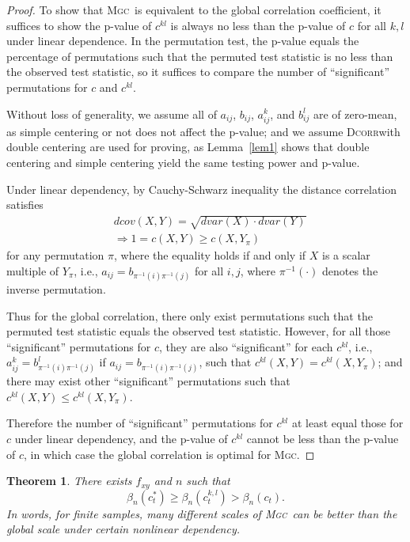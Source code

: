 \documentclass[11pt]{article}
\providecommand{\sct}[1]{{\normalfont\textsc{#1}}}
\newcommand{\G}{c}
\newcommand{\Mgc}{\sct{Mgc}}
\newcommand{\Dcorr}{\sct{Dcorr}}
\newtheorem{appThm}{Theorem}
\begin{document}
\begin{proof}
To show that \Mgc~is equivalent to the global correlation coefficient, it suffices to show the p-value of $\G^{kl}$ is always no less than the p-value of $\G$ for all $k,l$ under linear dependence. In the permutation test, the p-value equals the percentage of permutations such that the permuted test statistic is no less than the observed test statistic, so it suffices to compare the number of ``significant'' permutations for $\G$ and $\G^{kl}$.

Without loss of generality, we assume all of $a_{ij}$, $b_{ij}$, $a_{ij}^{k}$, and $b_{ij}^{l}$ are of zero-mean, as simple centering or not does not affect the p-value; and we assume \Dcorr with double centering are used for proving, as Lemma~\ref{lem1} shows that double centering and simple centering yield the same testing power and p-value.

Under linear dependency, by Cauchy-Schwarz inequality the distance correlation satisfies
\begin{align*}
& dcov(X,Y) = \sqrt{dvar(X) \cdot dvar(Y)} \\
& \Rightarrow 1=\G(X, Y) \geq \G(X, Y_{\pi})
\end{align*}
for any permutation $\pi$, where the equality holds if and only if $X$ is a scalar multiple of $Y_{\pi}$, i.e., $a_{ij}=b_{\pi^{-1}(i) \pi^{-1}(j)}$ for all $i,j$, where $\pi^{-1}(\cdot)$ denotes the inverse permutation. %

Thus for the global correlation, there only exist permutations such that the permuted test statistic equals the observed test statistic. However, for all those ``significant'' permutations for $\G$, they are also ``significant'' for each $\G^{kl}$, i.e., $a_{ij}^{k}=b_{\pi^{-1}(i) \pi^{-1}(j)}^{l}$ if $a_{ij}=b_{\pi^{-1}(i) \pi^{-1}(j)}$, such that $\G^{kl}(X, Y)=\G^{kl}(X, Y_{\pi})$; and there may exist other ``significant'' permutations such that $\G^{kl}(X, Y) \leq \G^{kl}(X, Y_{\pi})$.

Therefore the number of ``significant'' permutations for $\G^{kl}$ at least equal those for $\G$ under linear dependency, and the p-value of $\G^{kl}$ cannot be less than the p-value of $\G$, in which case the global correlation is optimal for \Mgc. 
\end{proof}


\begin{appThm}
There exists $f_{xy}$ and $n$ such that
\begin{equation}
\beta_n(\G^{*}_{t}) \geq \beta_n(\G^{k,l}_{t}) > \beta_n(\G_{t}).
\end{equation}
In words, for finite samples, many different scales of \Mgc~can be better than the global scale under certain nonlinear dependency.
\end{appThm}
\end{document}
